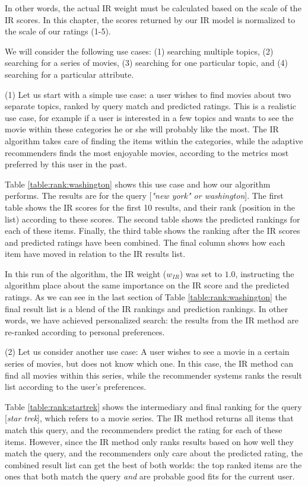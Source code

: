 In other words, the actual IR weight must
be calculated based on the scale of the IR scores.
In this chapter, the scores returned by our IR
model is normalized to the scale of our ratings (1-5).

We will consider the following use cases:
(1) searching multiple topics,
(2) searching for a series of movies,
(3) searching for one particular topic, and
(4) searching for a particular attribute.


\afterpage{\clearpage}

(1) Let us start with a simple use case:
a user wishes to find movies about two separate topics, ranked by 
query match and predicted ratings.
This is a realistic use case, for example if a user is interested
in a few topics and wants to see the movie within these categories
he or she will probably like the most.
The IR algorithm takes care of finding the items within the categories,
while the adaptive recommenders finds the most enjoyable movies,
according to the metrics most preferred by this user in the past.

Table \ref{table:rank:washington} shows this use case and how our algorithm performs.
The results are for the query [\emph{"new york" or washington}].
The first table shows the IR scores for the first 10 results,
and their rank (position in the list) according to these scores.
The second table shows the predicted rankings for each of these items.
Finally, the third table shows the ranking after the IR scores
and predicted ratings have been combined.
The final column shows how each item have moved in relation to the 
IR results list.

In this run of the algorithm, the IR weight ($w_{IR}$) was set to $1.0$,
instructing the algorithm place about the same importance on the IR score
and the predicted ratings. As we can see in the last section of 
Table \ref{table:rank:washington} the final result list is a blend
of the IR rankings and prediction rankings.
In other words, we have achieved personalized search: the results
from the IR method are re-ranked according to personal preferences.


(2) Let us consider another use case:
A user wishes to see a movie in a certain series of movies,
but does not know which one. In this case, the IR method can find all movies within this series,
while the recommender systems ranks the result list according to the user's preferences.

Table \ref{table:rank:startrek} shows the intermediary and final ranking
for the query [\emph{star trek}], which refers to a movie series.
The IR method returns all items that match this query,
and the recommenders predict the rating for each of these items.
However, since the IR method only ranks results based on how well they match the query,
and the recommenders only care about the predicted rating, the combined result
list can get the best of both worlds:
the top ranked items are the ones that both match the query \emph{and}
are probable good fits for the current user.

